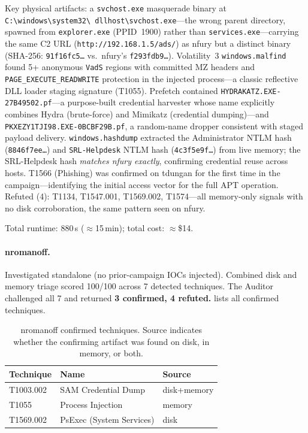 \documentclass[sigconf, nonacm]{acmart}
\begin{document}
Key physical artifacts: a \texttt{svchost.exe} masquerade binary at
\texttt{C:\textbackslash windows\textbackslash system32\textbackslash
dllhost\textbackslash svchost.exe}---the wrong parent directory,
spawned from \texttt{explorer.exe} (PPID~1900) rather than
\texttt{services.exe}---carrying the same C2 URL
(\texttt{http://192.168.1.5/ads/}) as nfury but a distinct binary
(SHA-256: \texttt{91f16fc5\ldots} vs.\ nfury's \texttt{f293fdb9\ldots}).
Volatility~3 \texttt{windows.malfind} found 5+ anonymous \texttt{VadS}
regions with committed MZ headers and \texttt{PAGE\_EXECUTE\_READWRITE}
protection in the injected process---a classic reflective DLL loader
staging signature (T1055). Prefetch contained
\texttt{HYDRAKATZ.EXE-27B49502.pf}---a purpose-built credential harvester
whose name explicitly combines Hydra (brute-force) and Mimikatz
(credential dumping)---and \texttt{PKXEZY1TJI98.EXE-0BCBF29B.pf},
a random-name dropper consistent with staged payload delivery.
\texttt{windows.hashdump} extracted the Administrator NTLM hash
(\texttt{8846f7ee\ldots}) and \texttt{SRL-Helpdesk} NTLM hash
(\texttt{4c3f5e9f\ldots}) from live memory; the SRL-Helpdesk hash
\emph{matches nfury exactly}, confirming credential reuse across hosts.
T1566 (Phishing) was confirmed on tdungan for the first time in
the campaign---identifying the initial access vector for the full APT
operation. Refuted (4): T1134, T1547.001, T1569.002, T1574---all
memory-only signals with no disk corroboration, the same pattern seen
on nfury.

Total runtime: 880\,s ($\approx$15\,min); total cost: $\approx$\$14.

\paragraph{nromanoff.}
Investigated standalone (no prior-campaign IOCs injected).
Combined disk and memory triage scored 100/100 across 7 detected
techniques. The Auditor challenged all 7 and returned
\textbf{3 confirmed, 4 refuted.}  lists all confirmed
techniques.

\begin{table}[ht]
\centering\small
\caption{nromanoff confirmed techniques. Source indicates whether the
  confirming artifact was found on disk, in memory, or both.}
\label{tab:nromanoff}
\begin{tabular}{@{}lll@{}}
\toprule
Technique & Name & Source \\
\midrule
T1003.002 & SAM Credential Dump         & disk+memory \\
T1055     & Process Injection           & memory \\
T1569.002 & PsExec (System Services)    & disk \\
\bottomrule
\end{tabular}
\end{table}
\end{document}
